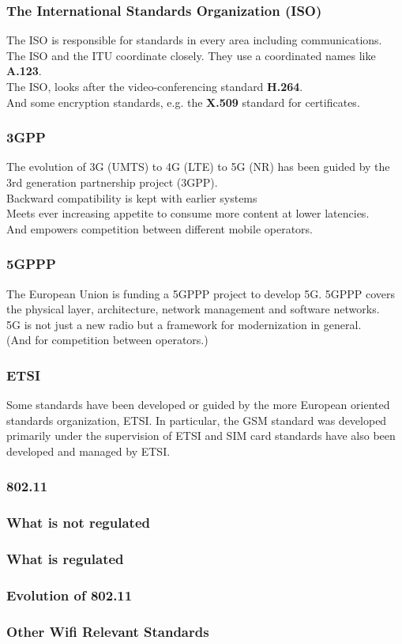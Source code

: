 \documentclass[18pt]{beamer}
\begin{document}
\begin{frame}\LARGE
\frametitle{The International Standards Organization (ISO)}
\large
The ISO is responsible for standards in every area
including communications.\\[4mm] 
The ISO and the ITU coordinate closely.
They use a coordinated names like {\bf A.123}.\\[4mm]
%
The ISO, looks after the video-conferencing standard {\bf H.264}.\\[4mm]
And some encryption standards, e.g. the {\bf X.509} standard for certificates.
\end{frame}

\begin{frame}\LARGE
\frametitle{3GPP}
\Large
The evolution of 3G (UMTS) to 4G (LTE) to 5G (NR) 
has been guided by the 3rd generation partnership project (3GPP).\\[3mm]
Backward compatibility is kept with earlier systems\\[3mm]
%
Meets ever increasing appetite to consume more content at lower latencies.  \\[3mm]
And empowers competition between different mobile operators.
\end{frame}

\begin{frame}\LARGE
\frametitle{5GPPP}
The European Union is funding a 5GPPP project
to develop 5G. 5GPPP covers the physical layer,
architecture, network management and software networks.\\[3mm]
%
5G is not just a new radio but a framework 
for modernization in general.\\[3mm]
%
(And for competition between operators.)
\end{frame}

\begin{frame}\LARGE
\frametitle{ETSI}
Some standards have been developed or guided by the more European
oriented standards organization, ETSI. In particular, the GSM \cite{GSM}
standard was developed primarily under the supervision of ETSI and
SIM card standards have also been developed and managed by ETSI.
\end{frame}

\begin{frame}\LARGE
\frametitle{802.11}
\end{frame}

\begin{frame}\LARGE
\frametitle{What is not regulated}
\end{frame}

\begin{frame}\LARGE
\frametitle{What is regulated}
\end{frame}

\begin{frame}\LARGE
\frametitle{Evolution of 802.11}
\end{frame}

\begin{frame}\LARGE
\frametitle{Other Wifi Relevant Standards}
%


\end{frame}
\end{document}
